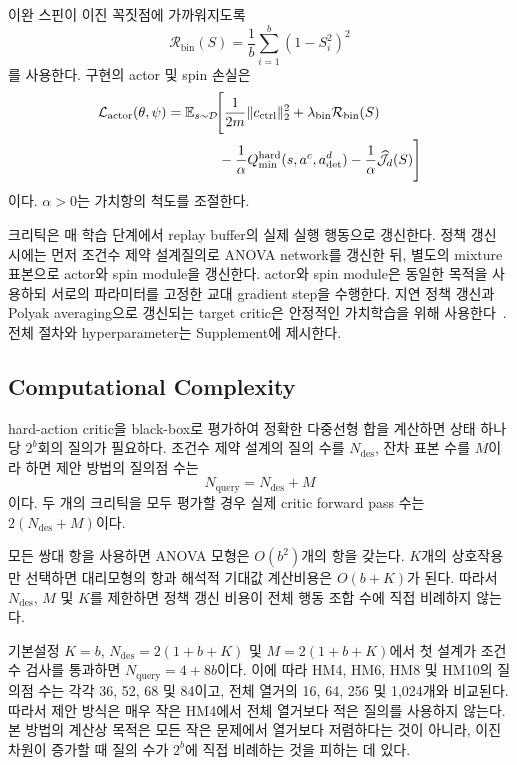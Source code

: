 \documentclass[10pt,journal]{IEEEtran}
\newcommand{\E}{\mathbb{E}}
\newcommand{\Dset}{\mathcal{D}}
\begin{document}
이완 스핀이 이진 꼭짓점에 가까워지도록
\begin{equation}
\mathcal{R}_{\mathrm{bin}}(S)
=
\frac{1}{b}
\sum_{i=1}^{b}(1-S_i^2)^2
\label{eq:binary-regularizer}
\end{equation}
를 사용한다. 구현의 actor 및 spin 손실은
\begin{align}
\mathcal{L}_{\mathrm{actor}}(\theta,\psi)
&=\E_{s\sim\Dset}\!\Bigg[
\frac{1}{2m}\|c_{\mathrm{ctrl}}\|_2^2
+\lambda_{\mathrm{bin}}\mathcal R_{\mathrm{bin}}(S)
\nonumber\\
&\hspace{13mm}
-\frac{1}{\alpha}Q_{\min}^{\mathrm{hard}}
(s,a^c,a_{\mathrm{det}}^d)
-\frac{1}{\alpha}\widehat{\mathcal J}_{d}(S)
\Bigg]
\label{eq:actor-objective}
\end{align}
이다. $\alpha>0$는 가치항의 척도를 조절한다.

크리틱은 매 학습 단계에서 replay buffer의 실제 실행 행동으로 갱신한다. 정책 갱신 시에는 먼저 조건수 제약 설계질의로 ANOVA network를 갱신한 뒤, 별도의 mixture 표본으로 actor와 spin module을 갱신한다. actor와 spin module은 동일한 목적을 사용하되 서로의 파라미터를 고정한 교대 gradient step을 수행한다. 지연 정책 갱신과 Polyak averaging으로 갱신되는 target critic은 안정적인 가치학습을 위해 사용한다~\cite{fujimoto2018}. 전체 절차와 hyperparameter는 Supplement에 제시한다.


\subsection{Computational Complexity}

hard-action critic을 black-box로 평가하여 정확한 다중선형 합을 계산하면 상태 하나당 $2^b$회의 질의가 필요하다. 조건수 제약 설계의 질의 수를 $N_{\mathrm{des}}$, 잔차 표본 수를 $M$이라 하면 제안 방법의 질의점 수는
\begin{equation}
N_{\mathrm{query}}
=
N_{\mathrm{des}}+M
\label{eq:query-complexity}
\end{equation}
이다. 두 개의 크리틱을 모두 평가할 경우 실제 critic forward pass 수는 $2(N_{\mathrm{des}}+M)$이다.

모든 쌍대 항을 사용하면 ANOVA 모형은 $O(b^2)$개의 항을 갖는다. $K$개의 상호작용만 선택하면 대리모형의 항과 해석적 기대값 계산비용은 $O(b+K)$가 된다. 따라서 $N_{\mathrm{des}}$, $M$ 및 $K$를 제한하면 정책 갱신 비용이 전체 행동 조합 수에 직접 비례하지 않는다.

기본설정 $K=b$, $N_{\mathrm{des}}=2(1+b+K)$ 및 $M=2(1+b+K)$에서 첫 설계가 조건수 검사를 통과하면 $N_{\mathrm{query}}=4+8b$이다. 이에 따라 HM4, HM6, HM8 및 HM10의 질의점 수는 각각 36, 52, 68 및 84이고, 전체 열거의 16, 64, 256 및 1,024개와 비교된다. 따라서 제안 방식은 매우 작은 HM4에서 전체 열거보다 적은 질의를 사용하지 않는다. 본 방법의 계산상 목적은 모든 작은 문제에서 열거보다 저렴하다는 것이 아니라, 이진 차원이 증가할 때 질의 수가 $2^b$에 직접 비례하는 것을 피하는 데 있다.
\end{document}
